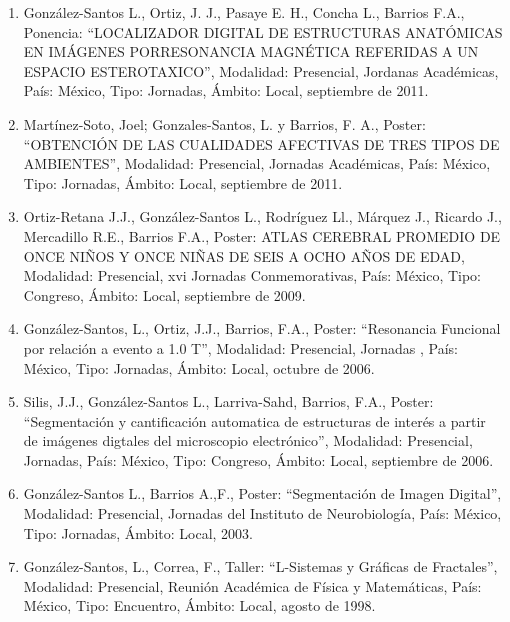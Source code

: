 \begin{enumerate}
\item González-Santos L., Ortiz, J. J., Pasaye E. H., Concha L., Barrios F.A., Ponencia: “LOCALIZADOR DIGITAL 
DE 
ESTRUCTURAS ANATÓMICAS EN IMÁGENES PORRESONANCIA MAGNÉTICA REFERIDAS A UN ESPACIO ESTEROTAXICO”, Modalidad: 
Presencial, Jordanas Académicas, País: México, Tipo: Jornadas, Ámbito: Local, septiembre de 2011.

\item Martínez-Soto, Joel; Gonzales-Santos, L. y Barrios, F. A., Poster: “OBTENCIÓN DE LAS CUALIDADES 
AFECTIVAS DE 
TRES TIPOS DE AMBIENTES”, Modalidad: Presencial, Jornadas Académicas, País: México, Tipo: Jornadas, Ámbito: 
Local, septiembre de 2011.

\item Ortiz-Retana J.J., González-Santos L., Rodríguez Ll., Márquez J., Ricardo J., Mercadillo R.E., Barrios 
F.A., 
Poster: ATLAS CEREBRAL PROMEDIO DE ONCE NIÑOS Y ONCE NIÑAS DE SEIS A OCHO AÑOS DE EDAD, Modalidad: Presencial, 
xvi Jornadas Conmemorativas, País: México, Tipo: Congreso, Ámbito: Local, septiembre de 2009.

\item González-Santos, L., Ortiz, J.J., Barrios, F.A., Poster: “Resonancia Funcional por relación a evento a 
1.0 T”, 
Modalidad: Presencial, Jornadas , País: México, Tipo: Jornadas, Ámbito: Local, octubre de 2006.

\item Silis, J.J., González-Santos L., Larriva-Sahd, Barrios, F.A., Poster: “Segmentación y cantificación 
automatica 
de estructuras de interés a partir de imágenes digtales del microscopio electrónico”, Modalidad: Presencial, 
Jornadas, País: México, Tipo: Congreso, Ámbito: Local, septiembre de 2006.

\item González-Santos L., Barrios A.,F., Poster: “Segmentación de Imagen Digital”, Modalidad: Presencial, 
Jornadas 
del Instituto de Neurobiología, País: México, Tipo: Jornadas, Ámbito: Local, 2003.

\item González-Santos, L., Correa, F., Taller: “L-Sistemas y Gráficas de Fractales”, Modalidad: Presencial, 
Reunión 
Académica de Física y Matemáticas, País: México, Tipo: Encuentro, Ámbito: Local, agosto de 1998.

\end{enumerate}

